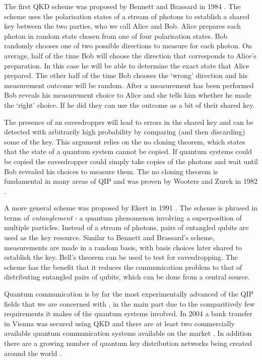 The first QKD scheme was proposed by Bennett and Brassard in 1984 \cite{bennett_brassard_84}. The scheme uses the polarisation states of a stream of photons to establish a shared key between the two parties, who we call Alice and Bob. Alice prepares each photon in random state chosen from one of four polarisation states. Bob randomly chooses one of two possible directions to measure for each photon. On average, half of the time Bob will choose the direction that corresponds to Alice's preparation. In this case he will be able to determine the exact state that Alice prepared. The other half of the time Bob chooses the `wrong' direction and his measurement outcome will be random. After a measurement has been performed Bob reveals his measurement choice to Alice and she tells him whether he made the `right' choice. If he did they can use the outcome as a bit of their shared key.

The presence of an eavesdropper will lead to errors in the shared key and can be detected with arbitrarily high probability by comparing (and then discarding) some of the key. This argument relies on the no cloning theorem, which states that the state of a quantum system cannot be copied. If quantum systems could be copied the eavesdropper could simply take copies of the photons and wait until Bob revealed his choices to measure them. The no cloning theorem is fundamental in many areas of QIP and was proven by Wooters and Zurek in 1982 \cite{no_cloning}.

A more general scheme was proposed by Ekert in 1991 \cite{ekert_91}. The scheme is phrased in terms of \textit{entanglement} - a quantum phenomenon involving a superposition of multiple particles. Instead of a stream of photons, pairs of entangled qubits are used as the key resource. Similar to Bennett and Brassard's scheme, measurements are made in a random basis, with basis choices later shared to establish the key. Bell's theorem \cite{bells_theorem} can be used to test for eavesdropping. The scheme has the benefit that it reduces the communication problem to that of distributing entangled pairs of qubits, which can be done from a central source.

Quantum communication is by far the most experimentally advanced of the QIP fields that we are concerned with \cite{quantum_crypt_review}, in the main part due to the comparitively few requirements it makes of the quantum systems involved. In 2004 a bank transfer in Vienna was secured using QKD \cite{qkd_bank_transfer_04} and there are at least two commercially available quantum communication systems available on the market \cite{idquant_qkd_system, magiq_qkd_system}. In addition there are a growing number of quantum key distribution networks being created around the world \cite{secoqc_network, tokyo_qkd_network}.

